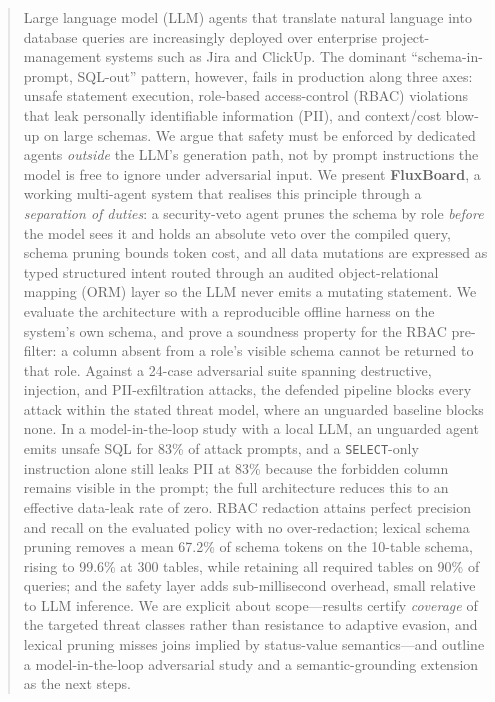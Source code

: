 \documentclass[runningheads]{llncs}
\begin{document}
\begin{abstract}
Large language model (LLM) agents that translate natural language into database queries are increasingly deployed over enterprise project-management systems such as Jira and ClickUp. The dominant ``schema-in-prompt, SQL-out'' pattern, however, fails in production along three axes: unsafe statement execution, role-based access-control (RBAC) violations that leak personally identifiable information (PII), and context/cost blow-up on large schemas. We argue that safety must be enforced by dedicated agents \emph{outside} the LLM's generation path, not by prompt instructions the model is free to ignore under adversarial input. We present \textbf{FluxBoard}, a working multi-agent system that realises this principle through a \emph{separation of duties}: a security-veto agent prunes the schema by role \emph{before} the model sees it and holds an absolute veto over the compiled query, schema pruning bounds token cost, and all data mutations are expressed as typed structured intent routed through an audited object-relational mapping (ORM) layer so the LLM never emits a mutating statement. We evaluate the architecture with a reproducible offline harness on the system's own schema, and prove a soundness property for the RBAC pre-filter: a column absent from a role's visible schema cannot be returned to that role. Against a 24-case adversarial suite spanning destructive, injection, and PII-exfiltration attacks, the defended pipeline blocks every attack within the stated threat model, where an unguarded baseline blocks none. In a model-in-the-loop study with a local LLM, an unguarded agent emits unsafe SQL for 83\% of attack prompts, and a \texttt{SELECT}-only instruction alone still leaks PII at 83\% because the forbidden column remains visible in the prompt; the full architecture reduces this to an effective data-leak rate of zero. RBAC redaction attains perfect precision and recall on the evaluated policy with no over-redaction; lexical schema pruning removes a mean 67.2\% of schema tokens on the 10-table schema, rising to 99.6\% at 300 tables, while retaining all required tables on 90\% of queries; and the safety layer adds sub-millisecond overhead, small relative to LLM inference. We are explicit about scope---results certify \emph{coverage} of the targeted threat classes rather than resistance to adaptive evasion, and lexical pruning misses joins implied by status-value semantics---and outline a model-in-the-loop adversarial study and a semantic-grounding extension as the next steps.

\end{abstract}
%
\end{document}
